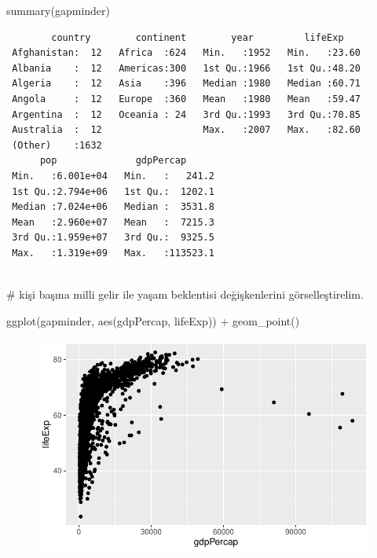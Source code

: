 \documentclass[
  letterpaper,
  DIV=11,
  numbers=noendperiod]{scrreprt}
\newenvironment{Shaded}{\begin{snugshade}}{\end{snugshade}}
\newcommand{\CommentTok}[1]{\textcolor[rgb]{0.37,0.37,0.37}{#1}}
\newcommand{\FunctionTok}[1]{\textcolor[rgb]{0.28,0.35,0.67}{#1}}
\newcommand{\NormalTok}[1]{\textcolor[rgb]{0.00,0.23,0.31}{#1}}
\newcommand{\SpecialCharTok}[1]{\textcolor[rgb]{0.37,0.37,0.37}{#1}}
\begin{document}
\begin{Shaded}
\begin{Highlighting}[]
\FunctionTok{summary}\NormalTok{(gapminder)}
\end{Highlighting}
\end{Shaded}

\begin{verbatim}
        country        continent        year         lifeExp     
 Afghanistan:  12   Africa  :624   Min.   :1952   Min.   :23.60  
 Albania    :  12   Americas:300   1st Qu.:1966   1st Qu.:48.20  
 Algeria    :  12   Asia    :396   Median :1980   Median :60.71  
 Angola     :  12   Europe  :360   Mean   :1980   Mean   :59.47  
 Argentina  :  12   Oceania : 24   3rd Qu.:1993   3rd Qu.:70.85  
 Australia  :  12                  Max.   :2007   Max.   :82.60  
 (Other)    :1632                                                
      pop              gdpPercap       
 Min.   :6.001e+04   Min.   :   241.2  
 1st Qu.:2.794e+06   1st Qu.:  1202.1  
 Median :7.024e+06   Median :  3531.8  
 Mean   :2.960e+07   Mean   :  7215.3  
 3rd Qu.:1.959e+07   3rd Qu.:  9325.5  
 Max.   :1.319e+09   Max.   :113523.1  
                                       
\end{verbatim}

\begin{Shaded}
\begin{Highlighting}[]
\CommentTok{\# kişi başına milli gelir ile yaşam beklentisi değişkenlerini görselleştirelim.}

\FunctionTok{ggplot}\NormalTok{(gapminder, }\FunctionTok{aes}\NormalTok{(gdpPercap, lifeExp)) }\SpecialCharTok{+}
  \FunctionTok{geom\_point}\NormalTok{()}
\end{Highlighting}
\end{Shaded}

\begin{figure}[H]

{\centering \includegraphics{regresyon_files/figure-pdf/unnamed-chunk-1-1.pdf}

}

\end{figure}
\end{document}
